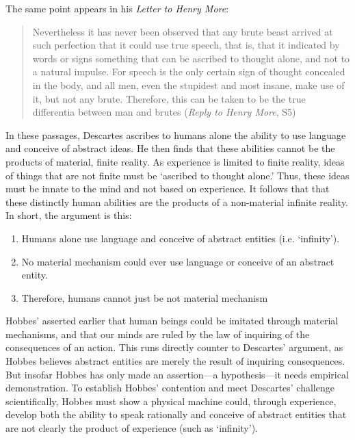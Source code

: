 The same point appears in his \emph{Letter to Henry More}:

\begin{quote}

Nevertheless it has never been observed that any brute beast arrived at such perfection that it could use true speech, that is, that it indicated by words or signs something that can be ascribed to thought alone, and not to a natural impulse. For speech is the only certain sign of thought concealed in the body, and all men, even the stupidest and most insane, make use of it, but not any brute. Therefore, this can be taken to be the true differentia between man and brutes (\emph{Reply to Henry More}, S5)
\end{quote}

In these passages, Descartes ascribes to humans alone the ability to use language and conceive of abstract ideas. He then finds that these abilities cannot be the products of material, finite reality. As experience is limited to finite reality, ideas of things that are not finite must be `ascribed to thought alone.' Thus, these ideas must be innate to the mind and not based on experience. It follows that that these distinctly human abilities are the products of a non-material infinite reality. In short, the argument is this:

\begin{enumerate}
\item Humans alone use language and conceive of abstract entities (i.e. `infinity').

\item No material mechanism could ever use language or conceive of an abstract entity.

\item Therefore, humans cannot just be not material mechanism

\end{enumerate}

Hobbes' asserted earlier that human beings could be imitated through material mechanisms, and that our minds are ruled by the law of inquiring of the consequences of an action. This runs directly counter to Descartes' argument, as Hobbes believes abstract entities are merely the result of inquiring consequences. But insofar Hobbes has only made an assertion—a hypothesis—it needs empirical demonstration. To establish Hobbes' contention and meet Descartes' challenge scientifically, Hobbes must show a physical machine could, through experience, develop both the ability to speak rationally and conceive of abstract entities that are not clearly the product of experience (such as `infinity').

